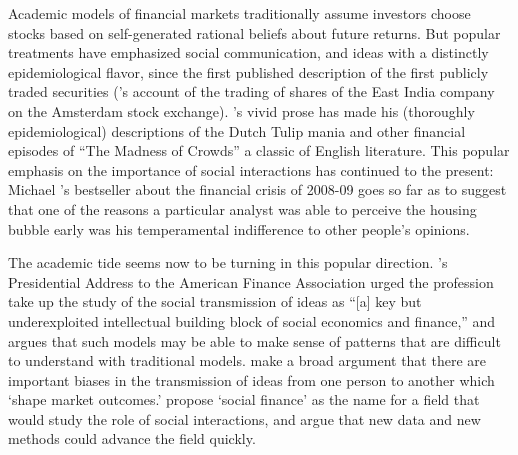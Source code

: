 Academic models of financial markets traditionally assume investors choose stocks based on self-generated rational beliefs about future returns.  But popular treatments have emphasized social communication, and ideas with a distinctly epidemiological flavor, since the first published description of  the first publicly traded securities (\cite{vegaConfusion}'s account of the trading of shares of the East India company on the Amsterdam stock exchange).  \cite{mackay1850memoirs}'s vivid prose has made his (thoroughly epidemiological) descriptions of the Dutch Tulip mania and other financial episodes of ``The Madness of Crowds'' a classic of English literature.  This popular emphasis on the importance of social interactions has continued to the present: Michael \cite{lewis2011big}'s bestseller about the financial crisis of 2008-09 goes so far as to suggest that one of the reasons a particular analyst was able to perceive the housing bubble early was his temperamental indifference to other people's opinions.


The academic tide seems now to be turning in this popular direction. \cite{hirshleifer2020presidential}'s Presidential Address to the American Finance Association urged the profession take up the study of the social transmission of ideas as ``[a] key but underexploited intellectual building block of social economics and finance,'' and argues that such models may be able to make sense of patterns that are difficult to understand with traditional models.  \cite{akccay2021social} make a broad argument that there are important biases in the transmission of ideas from one person to another which `shape market outcomes.' \cite{kuchler2021social} propose `social finance' as the name for a field that would study the role of social interactions, and argue that new data and new methods could advance the field quickly.

